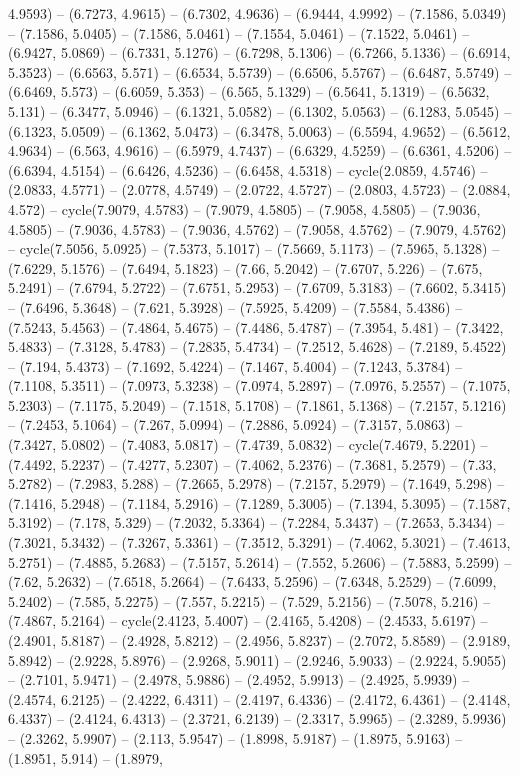 4.9593) -- (6.7273, 4.9615) -- (6.7302, 4.9636) -- (6.9444, 4.9992) -- (7.1586, 5.0349) -- (7.1586, 5.0405) -- (7.1586, 5.0461) -- (7.1554, 5.0461) -- (7.1522, 5.0461) -- (6.9427, 5.0869) -- (6.7331, 5.1276) -- (6.7298, 5.1306) -- (6.7266, 5.1336) -- (6.6914, 5.3523) -- (6.6563, 5.571) -- (6.6534, 5.5739) -- (6.6506, 5.5767) -- (6.6487, 5.5749) -- (6.6469, 5.573) -- (6.6059, 5.353) -- (6.565, 5.1329) -- (6.5641, 5.1319) -- (6.5632, 5.131) -- (6.3477, 5.0946) -- (6.1321, 5.0582) -- (6.1302, 5.0563) -- (6.1283, 5.0545) -- (6.1323, 5.0509) -- (6.1362, 5.0473) -- (6.3478, 5.0063) -- (6.5594, 4.9652) -- (6.5612, 4.9634) -- (6.563, 4.9616) -- (6.5979, 4.7437) -- (6.6329, 4.5259) -- (6.6361, 4.5206) -- (6.6394, 4.5154) -- (6.6426, 4.5236) -- (6.6458, 4.5318) -- cycle(2.0859, 4.5746) -- (2.0833, 4.5771) -- (2.0778, 4.5749) -- (2.0722, 4.5727) -- (2.0803, 4.5723) -- (2.0884, 4.572) -- cycle(7.9079, 4.5783) -- (7.9079, 4.5805) -- (7.9058, 4.5805) -- (7.9036, 4.5805) -- (7.9036, 4.5783) -- (7.9036, 4.5762) -- (7.9058, 4.5762) -- (7.9079, 4.5762) -- cycle(7.5056, 5.0925) -- (7.5373, 5.1017) -- (7.5669, 5.1173) -- (7.5965, 5.1328) -- (7.6229, 5.1576) -- (7.6494, 5.1823) -- (7.66, 5.2042) -- (7.6707, 5.226) -- (7.675, 5.2491) -- (7.6794, 5.2722) -- (7.6751, 5.2953) -- (7.6709, 5.3183) -- (7.6602, 5.3415) -- (7.6496, 5.3648) -- (7.621, 5.3928) -- (7.5925, 5.4209) -- (7.5584, 5.4386) -- (7.5243, 5.4563) -- (7.4864, 5.4675) -- (7.4486, 5.4787) -- (7.3954, 5.481) -- (7.3422, 5.4833) -- (7.3128, 5.4783) -- (7.2835, 5.4734) -- (7.2512, 5.4628) -- (7.2189, 5.4522) -- (7.194, 5.4373) -- (7.1692, 5.4224) -- (7.1467, 5.4004) -- (7.1243, 5.3784) -- (7.1108, 5.3511) -- (7.0973, 5.3238) -- (7.0974, 5.2897) -- (7.0976, 5.2557) -- (7.1075, 5.2303) -- (7.1175, 5.2049) -- (7.1518, 5.1708) -- (7.1861, 5.1368) -- (7.2157, 5.1216) -- (7.2453, 5.1064) -- (7.267, 5.0994) -- (7.2886, 5.0924) -- (7.3157, 5.0863) -- (7.3427, 5.0802) -- (7.4083, 5.0817) -- (7.4739, 5.0832) -- cycle(7.4679, 5.2201) -- (7.4492, 5.2237) -- (7.4277, 5.2307) -- (7.4062, 5.2376) -- (7.3681, 5.2579) -- (7.33, 5.2782) -- (7.2983, 5.288) -- (7.2665, 5.2978) -- (7.2157, 5.2979) -- (7.1649, 5.298) -- (7.1416, 5.2948) -- (7.1184, 5.2916) -- (7.1289, 5.3005) -- (7.1394, 5.3095) -- (7.1587, 5.3192) -- (7.178, 5.329) -- (7.2032, 5.3364) -- (7.2284, 5.3437) -- (7.2653, 5.3434) -- (7.3021, 5.3432) -- (7.3267, 5.3361) -- (7.3512, 5.3291) -- (7.4062, 5.3021) -- (7.4613, 5.2751) -- (7.4885, 5.2683) -- (7.5157, 5.2614) -- (7.552, 5.2606) -- (7.5883, 5.2599) -- (7.62, 5.2632) -- (7.6518, 5.2664) -- (7.6433, 5.2596) -- (7.6348, 5.2529) -- (7.6099, 5.2402) -- (7.585, 5.2275) -- (7.557, 5.2215) -- (7.529, 5.2156) -- (7.5078, 5.216) -- (7.4867, 5.2164) -- cycle(2.4123, 5.4007) -- (2.4165, 5.4208) -- (2.4533, 5.6197) -- (2.4901, 5.8187) -- (2.4928, 5.8212) -- (2.4956, 5.8237) -- (2.7072, 5.8589) -- (2.9189, 5.8942) -- (2.9228, 5.8976) -- (2.9268, 5.9011) -- (2.9246, 5.9033) -- (2.9224, 5.9055) -- (2.7101, 5.9471) -- (2.4978, 5.9886) -- (2.4952, 5.9913) -- (2.4925, 5.9939) -- (2.4574, 6.2125) -- (2.4222, 6.4311) -- (2.4197, 6.4336) -- (2.4172, 6.4361) -- (2.4148, 6.4337) -- (2.4124, 6.4313) -- (2.3721, 6.2139) -- (2.3317, 5.9965) -- (2.3289, 5.9936) -- (2.3262, 5.9907) -- (2.113, 5.9547) -- (1.8998, 5.9187) -- (1.8975, 5.9163) -- (1.8951, 5.914) -- (1.8979, 
